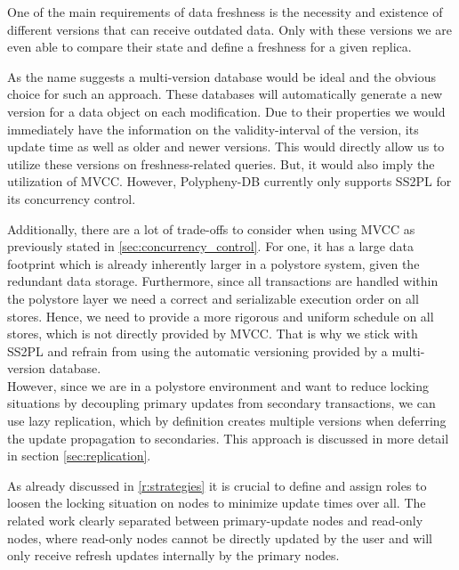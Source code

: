 One of the main requirements of data freshness is the necessity and existence of different versions that can receive outdated data. 
Only with these versions we are even able to compare their state and define a freshness for a given replica.

As the name suggests a multi-version database would be ideal and the obvious choice for such an approach.
These databases will automatically generate a new version for a data object on each modification.
Due to their properties we would immediately have the information on the validity-interval of the version, its update time as well as older and newer versions.
This would directly allow us to utilize these versions on freshness-related queries. But, it would also imply the utilization of MVCC.
However, Polypheny-DB currently only supports SS2PL for its concurrency control. 

Additionally, there are a lot of trade-offs to consider when using MVCC as previously stated in \ref{sec:concurrency_control}.
For one, it has a large data footprint which is already inherently larger in a polystore system, given the redundant data storage.
Furthermore, since all transactions are handled within the polystore layer we need a correct and serializable execution order on all stores. Hence, we need to provide
a more rigorous and uniform schedule on all stores, which is not directly provided by MVCC.
That is why we stick with SS2PL and refrain from using the automatic versioning provided by a multi-version database.\\

However, since we are in a polystore environment and want to reduce locking situations by decoupling primary updates from secondary transactions,
we can use lazy replication, which by definition creates multiple versions when deferring the update propagation to secondaries.
This approach is discussed in more detail in section \ref{sec:replication}.\\
 





As already discussed in \ref{r:strategies} it is crucial to define and assign roles to loosen the locking situation on nodes
to minimize update times over all.
The related work clearly separated between primary-update nodes and read-only nodes, where 
read-only nodes cannot be directly updated by the user and will only receive refresh updates internally by the primary nodes.

